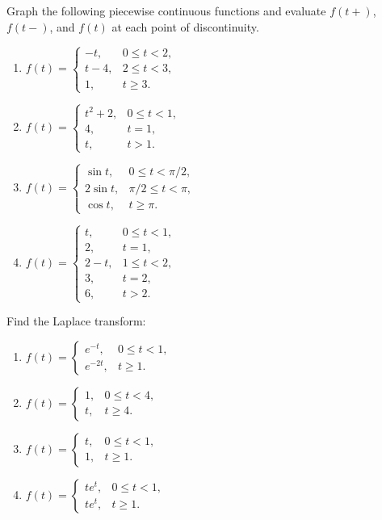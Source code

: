 \documentclass{ximera}
\begin{document}
\begin{problem}\label{exer:8.1.4}
 Graph the following piecewise continuous functions and evaluate
$f(t+)$, $f(t-)$, and $f(t)$ at each point of discontinuity.

\begin{enumerate}
    \item $f(t)=\left\{\begin{array}{cl} -t,
& 0\le t<2,\\ t-4, & 2\le t<3,\\ 1, & t\ge
3.\end{array}\right.$
    \item $f(t)=\left\{\begin{array}{cl} t^2+2, & 0
\le t<1,\\4, & t=1,\\ t, & t>
1.\end{array}\right.$
    \item $f(t)=\left\{\begin{array}{rl}
\sin t, & 0\le t<\pi/ 2,\\ 2\sin t, &\pi/ 2
\le t<\pi,\\ \cos t, & t\ge\pi.\end{array}\right.$
    \item $f(t)=\left\{\begin{array}{cl}t,
 & 0\le t<1,\\ 2, & t=1,\\ 2-t, & 1
\le t<2,\\ 3, & t=2,\\ 6, & t>
2.\end{array}\right.$
\end{enumerate}
\end{problem}

\begin{problem}\label{exer:8.1.5}
 Find the Laplace transform:

\begin{enumerate}
    \item $f(t)=\left\{\begin{array}{rl} e^{-t}, &
0\le t<1,\\ e^{-2t}, & t\ge 1.\end{array}\right.$ 
    \item $f(t)=\left\{\begin{array}{rl} 1, & 0\le t<
4,\\ t, & t\ge 4.\end{array}\right.$
    \item $f(t)=\left\{\begin{array}{rl} t, & 0\le
t<1,\\ 1, & t\ge 1.\end{array}\right.$
    \item $f(t)=\left\{\begin{array}{rl} te^t, & 0\le
t<1,\\t e^t, & t\ge 1.\end{array}\right.$
\end{enumerate}
\end{problem}
\end{document}
